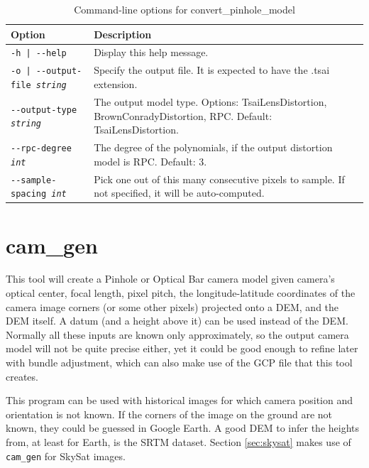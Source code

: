 \begin{longtable}{|l|p{7.5cm}|}
\caption{Command-line options for convert\_pinhole\_model}
\label{tbl:convertpinholemodel}
\endfirsthead
\endhead
\endfoot
\endlastfoot
\hline
Option & Description \\ \hline \hline
\texttt{-h | -\/-help } & Display this help message.\\ \hline

\texttt{-o | -\/-output-file \textit{string} } & Specify the output file. It is expected to have the .tsai extension. \\ \hline

\texttt{-\/-output-type \textit{string}} & The output model type. Options: TsaiLensDistortion, 
BrownConradyDistortion, RPC. Default: TsaiLensDistortion.\\ \hline

\texttt{-\/-rpc-degree \textit{int}} & The degree of the polynomials, if the output distortion model is RPC. Default: 3. \\ \hline

\texttt{-\/-sample-spacing \textit{int}} & Pick one out of this many consecutive pixels to sample. If not specified, it will be auto-computed. \\ \hline

\end{longtable}

\clearpage

\section{cam\_gen}
\label{camgen}

This tool will create a Pinhole or Optical Bar camera model given camera's optical
center, focal length, pixel pitch, the longitude-latitude coordinates of
the camera image corners (or some other pixels) projected onto a DEM,
and the DEM itself. A datum (and a height above it) can be used instead
of the DEM. Normally all these inputs are known only approximately, so
the output camera model will not be quite precise either, yet it could
be good enough to refine later with bundle adjustment, which can also
make use of the GCP file that this tool creates.

This program can be used with historical images for which camera position and orientation
is not known. If the corners of the image on the ground are not known, they could be guessed
in Google Earth. A good DEM to infer the heights from, at least for Earth,
is the SRTM dataset. Section \ref{sec:skysat} makes use of \texttt{cam\_gen} for SkySat images.

